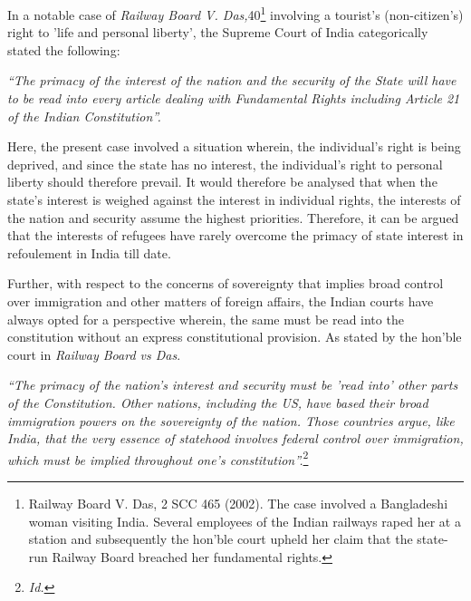 \begin{multicols}{2}
\noi
In a notable case of \textit{Railway Board V. Das,}40\footnote{Railway Board V. Das, 2 SCC 465 (2002). The case involved a Bangladeshi woman visiting India. Several employees of the Indian railways raped her at a station and subsequently the hon’ble court upheld her claim that the state-run Railway Board breached her fundamental rights.} involving a tourist's (non-citizen's) right to 'life and personal liberty', the Supreme Court of India categorically stated the following:

\vspace{-.1cm}

\noi
\textit{“The primacy of the interest of the nation and the security of the State will have to be read
into every article dealing with Fundamental Rights including Article 21 of the Indian
Constitution”.}

\vspace{-.1cm}

\noi
Here, the present case involved a situation wherein, the individual's right is being deprived,
and since the state has no interest, the individual's right to personal liberty should therefore
prevail. It would therefore be analysed that when the state's interest is weighed against the
interest in individual rights, the interests of the nation and security assume the highest
priorities. Therefore, it can be argued that the interests of refugees have rarely overcome the
primacy of state interest in refoulement in India till date.

\vspace{-.1cm}

\noi
Further, with respect to the concerns of sovereignty that implies broad control over
immigration and other matters of foreign affairs, the Indian courts have always opted for a
perspective wherein, the same must be read into the constitution without an express
constitutional provision. As stated by the hon’ble court in \textit{Railway Board vs Das}.

\vspace{-.1cm}
\noi
\textit{“The primacy of the nation's interest and security must be 'read into' other parts of the
Constitution. Other nations, including the US, have based their broad immigration powers on
the sovereignty of the nation. Those countries argue, like India, that the very essence of statehood involves federal control over immigration, which must be implied throughout one's
constitution”.}\footnote{\textit{Id.}}


\end{multicols}
